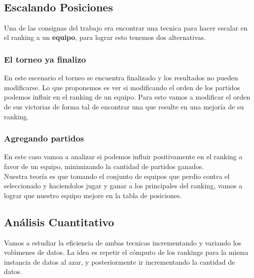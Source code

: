 \\



\subsection{Escalando Posiciones}

Una de las consignas del trabajo era encontrar una tecnica para hacer escalar en el ranking a un \textbf{equipo}, para lograr esto tenemos dos alternativas. \\


\subsubsection{El torneo ya finalizo}

En este escenario el torneo se encuentra finalizado y los resultados no pueden modificarse. Lo que proponemos es ver si modificando el orden de los partidos podemos influir en el ranking de un equipo. Para esto vamos a modificar el orden de sus victorias de forma tal de encontrar una que resulte en una mejoría de su ranking. \\


\subsubsection{Agregando partidos}

En este caso vamoa a analizar si podemos influir positivamente en el ranking a favor de un equipo, minimizando la cantidad de partidos ganados. \\

Nuestra teoría es que tomando el conjunto de equipos que perdio contra el seleccionado y haciendolos jugar y ganar a los principales del ranking, vamos a lograr que nuestro equipo mejore en la tabla de posiciones. \\



\subsection{Análisis Cuantitativo}


Vamos a estudiar la eficiencia de ambas tecnicas incrementando y variando los volúmenes de datos. La idea es repetir el cómputo de los rankings para la misma instancia de datos al azar, y posteriormente ir incrementando la cantidad de datos. \\

